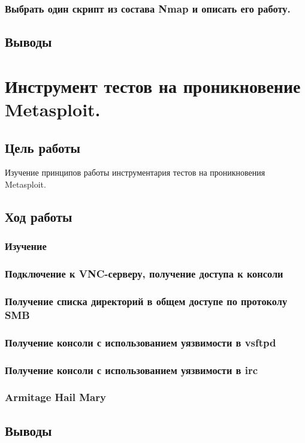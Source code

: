 \documentclass[a4paper, 14pt]{article}				%
\begin{document}
\subsubsection{Выбрать один скрипт из состава Nmap и описать его работу.}


\subsection{Выводы}


\section{Инструмент тестов на проникновение Metasploit.}

\subsection{Цель работы}
Изучение принципов работы инструментария тестов на проникновения Metasploit.
\subsection{Ход работы}



\subsubsection{Изучение}



\subsubsection{Подключение к VNC-серверу, получение доступа к консоли}



\subsubsection{Получение списка директорий в общем доступе по протоколу SMB}



\subsubsection{Получение консоли с использованием уязвимости в vsftpd}



\subsubsection{Получение консоли с использованием уязвимости в irc}


\subsubsection{Armitage Hail Mary}


\subsection{Выводы}
\end{document}
